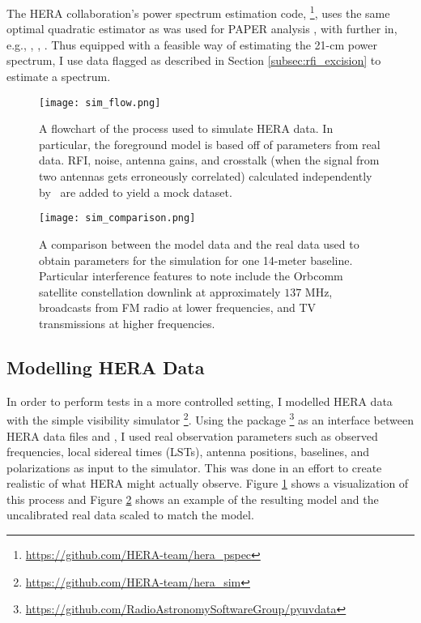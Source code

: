 \documentclass[12pt]{article}
\begin{document}
The HERA collaboration's power spectrum estimation code, \herapspec\footnote{\url{https://github.com/HERA-team/hera_pspec}}, uses the same optimal quadratic estimator as was used for PAPER analysis \citep{ali2015}, with further  in, e.g., \cite{tegmark1997}, \cite{tegmark1998}, \cite{liu2011}. Thus equipped with a feasible way of estimating the 21-cm power spectrum, I use data flagged as described in Section \ref{subsec:rfi_excision} to estimate a  spectrum.


\begin{figure}[t]
	\centering
	\texttt{[image: sim\_flow.png]}
	\caption[Flowchart of the process of modelling HERA data]{A flowchart of the process used to simulate HERA data. In particular, the foreground model is based off of parameters from real data. RFI, noise, antenna gains, and crosstalk (when the signal from two antennas gets erroneously correlated) calculated independently by \herasim~are added to yield a mock dataset.}
	\label{fig:sim_flow}
\end{figure}

\begin{figure}[p]
	\centering
	\texttt{[image: sim\_comparison.png]}
	\caption[Comparison of simulated and real data]{A comparison between the model data and the real data used to obtain parameters for the simulation for one 14-meter baseline. Particular interference features to note include the Orbcomm satellite constellation downlink at approximately $137$ MHz, broadcasts from FM radio at lower frequencies, and TV transmissions at higher frequencies.}
	\label{fig:sim_comparison}
\end{figure}

\subsection{Modelling HERA Data} \label{subsec:modelling}

In order to perform tests in a more controlled setting, I modelled HERA data with the simple visibility simulator \herasim\footnote{\url{https://github.com/HERA-team/hera_sim}}. Using the package \pyuvdata\footnote{\url{https://github.com/RadioAstronomySoftwareGroup/pyuvdata}} as an interface between HERA data files and \herasim, I used real observation parameters such as observed frequencies, local sidereal times (LSTs), antenna positions, baselines, and polarizations as input to the simulator. This was done in an effort to create realistic  of what HERA might actually observe. Figure \ref{fig:sim_flow} shows a visualization of this process and Figure \ref{fig:sim_comparison} shows an example of the resulting model and the uncalibrated real data scaled to match the model.
\end{document}
